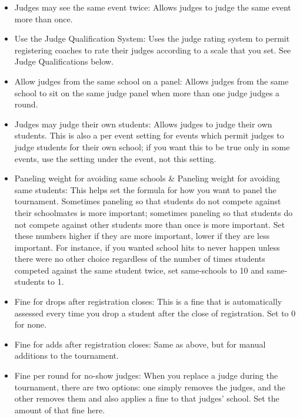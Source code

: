 \documentclass[12pt]{report} \usepackage {fullpage} \usepackage{times}
\begin{document}
\begin{itemize}
\item Judges may see the same event twice:  Allows judges to judge the same
event more than once.

\item Use the Judge Qualification System: 	Uses the judge rating system to
permit registering coaches to rate their judges according to a scale that
you set.  See Judge Qualifications below.

\item Allow judges from the same school on a panel:  Allows judges from the
same school to sit on the same judge panel when more than one judge judges
a round.

\item Judges may judge their own students: 	 Allows judges to judge their
own students.  This is also a per event setting for events which permit
judges to judge students for their own school; if you want this to be true
only in some events, use the setting under the event, not this setting.

\item Paneling weight for avoiding same schools \& Paneling weight for
avoiding same students:   This helps set the formula for how you want to
panel the tournament.  Sometimes paneling so that students do not compete
against their schoolmates is more important; sometimes paneling so that
students do not compete against other students more than once is more
important.  Set these numbers higher if they are more important, lower if
they are less important.   For instance, if you wanted school hits to never
happen unless there were no other choice regardless of the number of times
students competed against the same student twice, set same-schools to 10
and same-students to 1.
	
\item Fine for drops after registration closes:  This is a fine that is
automatically assessed every time you drop a student after the close of
registration.  Set to 0 for none.

\item Fine for adds after registration closes:  Same as above, but for
manual additions to the tournament.

\item Fine per round for no-show judges:   When you replace a judge during
the tournament, there are two options: one simply removes the judges, and
the other removes them and also applies a fine to that judges' school.  Set
the amount of that fine here.


\end{itemize}
\end{document}
